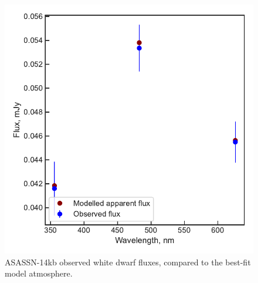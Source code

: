 \begin{figure}
    \centering
    \includegraphics[width=\textwidth]{figures/results/ASASSN-14kb/fluxplot.pdf}
    \caption{ASASSN-14kb observed white dwarf fluxes, compared to the best-fit model atmosphere.}
    \label{fig:ASASSN-14kb flux plot}
\end{figure}
\clearpage


